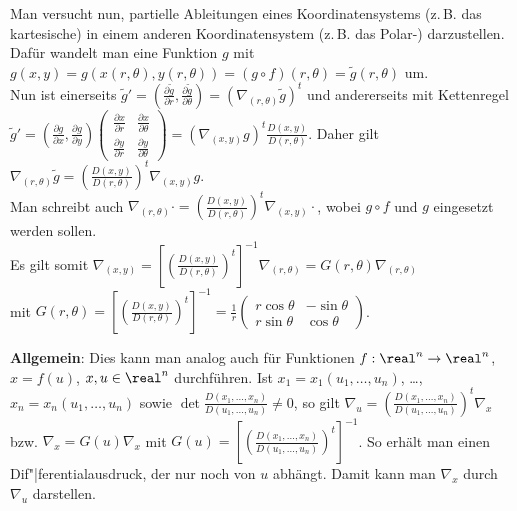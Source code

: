 Man versucht nun, partielle Ableitungen eines Koordinatensystems
(z.\,B. das kartesische) in einem anderen Koordinatensystem
(z.\,B. das Polar-) darzustellen.
Dafür wandelt man eine Funktion $g$ mit
$g(x, y) = g(x(r, \theta), y(r, \theta)) = (g \circ f)(r, \theta) =
\widetilde{g}(r, \theta)$ um. \\
Nun ist einerseits
$\widetilde{g}' = \left(\frac{\partial \widetilde{g}}{\partial r},
\frac{\partial \widetilde{g}}{\partial \theta}\right) =
(\nabla_{(r, \theta)} \widetilde{g})^t$ und andererseits mit Kettenregel \\
$\widetilde{g}' = \left(\frac{\partial g}{\partial x},
\frac{\partial g}{\partial y}\right)
\begin{pmatrix}\frac{\partial x}{\partial r} &
\frac{\partial x}{\partial \theta} \\
\frac{\partial y}{\partial r} &
\frac{\partial y}{\partial \theta}\end{pmatrix} =
(\nabla_{(x,y)} g)^t \frac{D(x, y)}{D(r, \theta)}$.
Daher gilt $\nabla_{(r,\theta)} \widetilde{g} =
\left(\frac{D(x, y)}{D(r, \theta)}\right)^t \nabla_{(x,y)} g$. \\
Man schreibt auch
$\nabla_{(r,\theta)} \cdot =
\left(\frac{D(x, y)}{D(r, \theta)}\right)^t \nabla_{(x,y)} \cdot$,
wobei $g \circ f$ und $g$ eingesetzt werden sollen. \\
Es gilt somit $\nabla_{(x,y)} =
\left[\left(\frac{D(x, y)}{D(r, \theta)}\right)^t\right]^{-1}
\nabla_{(r,\theta)} = G(r, \theta) \nabla_{(r,\theta)}$ \\
mit $G(r, \theta) =
\left[\left(\frac{D(x, y)}{D(r, \theta)}\right)^t\right]^{-1} =
\frac{1}{r} \begin{pmatrix}r \cos \theta & -\sin \theta \\
r \sin \theta & \cos \theta\end{pmatrix}$.

\linie

\textbf{Allgemein}:
Dies kann man analog auch für Funktionen $f: \real^n \rightarrow \real^n$,
$x = f(u)$, $x, u \in \real^n$ durchführen.
Ist $x_1 = x_1(u_1, \dotsc, u_n)$, \dots, $x_n = x_n(u_1, \dotsc, u_n)$
sowie $\det \frac{D(x_1, \dotsc, x_n)}{D(u_1, \dotsc, u_n)} \not= 0$, so
gilt $\nabla_u = \left(\frac{D(x_1, \dotsc, x_n)}{D(u_1, \dotsc, u_n)}\right)^t
\nabla_x$ bzw.
$\nabla_x = G(u) \nabla_x$ mit
$G(u) = \left[\left(\frac{D(x_1, \dotsc, x_n)}
{D(u_1, \dotsc, u_n)}\right)^t\right]^{-1}$.
So erhält man einen Dif"|ferentialausdruck, der nur noch von $u$ abhängt.
Damit kann man $\nabla_x$ durch $\nabla_u$ darstellen.

